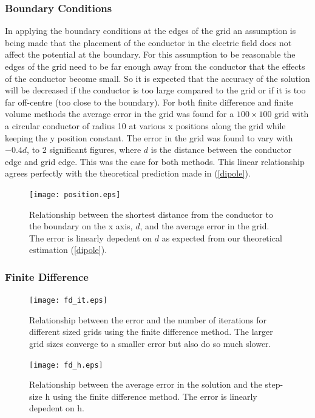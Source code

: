 \documentclass[aps,twocolumn,pre,nofootinbib,10pt]{revtex4-1}
\begin{document}
\subsubsection{Boundary Conditions}

In applying the boundary conditions at the edges of the grid an assumption is being made that the placement of the conductor in the electric field does not affect the potential at the boundary. For this assumption to be reasonable the edges of the grid need to be far enough away from the conductor that the effects of the conductor become small. So it is expected that the accuracy of the solution will be decreased if the conductor is too large compared to the grid or if it is too far off-centre (too close to the boundary). For both finite difference and finite volume methods the average error in the grid was found for a $100 \times 100$ grid with a circular conductor of radius 10 at various x positions along the grid while keeping the y position constant. The error in the grid was found to vary with \(-0.4d\), to 2 significant figures, where $d$ is the distance between the conductor edge and grid edge. This was the case for both methods. This linear relationship agrees perfectly with the theoretical 
prediction made in (\ref{dipole}).

\begin{figure}
\texttt{[image: position.eps]}
\caption{Relationship between the shortest distance from the conductor to the boundary on the x axis, $d$, and the average error in the grid. The error is linearly depedent on $d$ as expected from our theoretical estimation (\ref{dipole}).}
\label{fig:fd_distance}
\end{figure}


\subsubsection{Finite Difference}

\begin{figure}
\texttt{[image: fd\_it.eps]}

\caption{Relationship between the error and the number of iterations for different sized grids using the finite difference method. The larger grid sizes converge to a smaller error but also do so much slower.}
\label{fig:fd}
\end{figure}

\begin{figure}
\texttt{[image: fd\_h.eps]}

\caption{Relationship between the average error in the solution and the step-size h using the finite difference method. The error is linearly depedent on h.}
\label{fig:fd_lin}
\end{figure}
\end{document}
